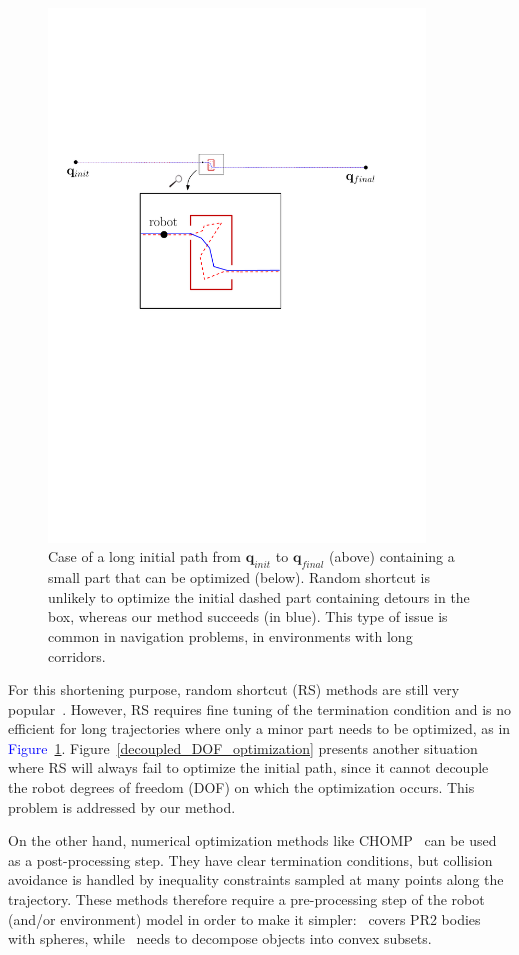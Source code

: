 \documentclass{tADR2e}
\newcommand\conf{\mathbf{q}}
\begin{document}
\begin{figure}
	\centering
	\includegraphics[width=10cm]{local_box_optim2.pdf}
	\caption{Case of a long initial path from $\conf_{init}$ to $\conf_{final}$ (above) containing a small part 
	that can 
	be optimized (below). Random shortcut is unlikely to optimize the initial 
	dashed part containing detours in the box, whereas our method 
	succeeds (in blue). This type of issue is common in navigation problems, in 
	environments with long corridors.}
	\label{local_box_optim}
\end{figure}

For this shortening purpose, random shortcut (RS) methods are
still very 
popular~\cite{Sekhavat-Svestka1998,GeraertsIJRR07,HauserFastSmooth}. 
However, RS requires fine 
tuning of the termination condition and is no efficient for long 
trajectories where only a minor part needs to be optimized, 
as in \textcolor{blue}{Figure~\ref{local_box_optim}}.
Figure~\ref{decoupled_DOF_optimization} presents another situation where RS 
will always fail to optimize the initial path, since it cannot decouple the 
robot degrees of freedom (DOF) on which the optimization occurs. This problem is 
addressed by our method.


On the other hand, numerical
optimization methods like CHOMP~\cite{chompIjrr} can be used as a
post-processing step. They have clear termination conditions, but collision
avoidance is handled by inequality constraints sampled at many points along
the trajectory. These methods therefore require a pre-processing step of the
robot (and/or environment) model in order to make 
it simpler:~\cite{chompIjrr} covers PR2 bodies with spheres, 
while~\cite{convexOptimMotplan} needs to decompose objects into convex subsets.
\end{document}

